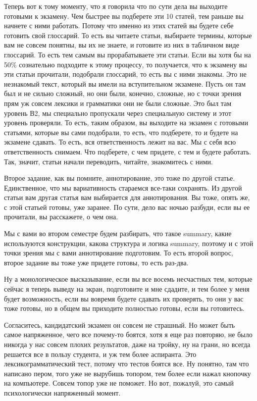 \documentclass[main.tex]{subfiles}
\begin{document}
Теперь вот к тому моменту, что я говорила что по сути дела вы выходите готовыми к экзамену.
Чем быстрее вы подберете эти 10 статей, тем раньше вы начнете с ними работать.
Потому что именно из этих статей вы будете себе готовить свой глоссарий.
То есть вы читаете статьи, выбираете термины, которые вам не совсем понятны, вы их не знаете, и готовите из них в табличном виде глоссарий.
То есть тем самым вы прорабатываете эти статьи.
Если вы хотя бы на 50\% сознательно подходите к этому процессу, то получается, что к экзамену вы эти статьи прочитали, подобрали глоссарий, то есть вы с ними знакомы.
Это не незнакомый текст, который вы имели на вступительном экзамене.
Пусть он там был и не сильно сложный, но они были, конечно, сложные, но с точки зрения прям уж совсем лексики и грамматики они не были сложные.
Это был там уровень В2, мы специально пропускали через специальную систему и этот уровень проверяли.
То есть, таким образом, вы выходите на экзамен с готовыми статьями, которые вы сами подобрали, то есть, что подберете, то и будете на экзамене сдавать.
То есть, вся ответственность лежит на вас.
Мы с себя всю ответственность снимаем.
Что подберете, с чем придете, с тем и будете работать.
Так, значит, статьи начали переводить, читайте, знакомитесь с ними.

Второе задание, как вы помните, аннотирование, это тоже по другой статье.
Единственное, что мы вариативность стараемся все-таки сохранять.
Из другой статьи вам другая статья вам выбирается для аннотирования.
Вы тоже, опять же, с этой статьей готовы, уже заранее.
По сути, дело вас ночью разбуди, если вы ее прочитали, вы расскажете, о чем она.

Мы с вами во втором семестре будем разбирать, что такое summary, какие используются конструкции, какова структура и логика summary, поэтому и с этой точки зрения мы с вами аннотирование подготовим.
То есть второй вопрос, второе задание вы тоже уже придете готовы, то есть раз-два.

Ну а монологическое высказывание, если вы все восемь несчастных тем, которые сейчас я теперь выведу на экран, подготовите и мне сдадите, и тем более у меня будет возможность, если вы вовремя будете сдавать их проверять, то они у вас тоже готовы, но в общем вы приходите полностью готовы, если вы готовитесь.

Согласитесь, кандидатский экзамен он совсем не страшный.
Но может быть самое напряженное, чего все почему-то боятся, хотя я еще раз повторяю, не было никогда у нас совсем плохих результатов, даже на тройку, ну на грани, но всегда решается все в пользу студента, и уж тем более аспиранта.
Это лексикограмматический тест, потому что тестов боятся все.
Ну понятно, там что написано пером, того уже не вырубишь топором, тем более если нажал кнопочку на компьютере.
Совсем топор уже не поможет.
Но вот, пожалуй, это самый психологически напряженный момент.
\end{document}
